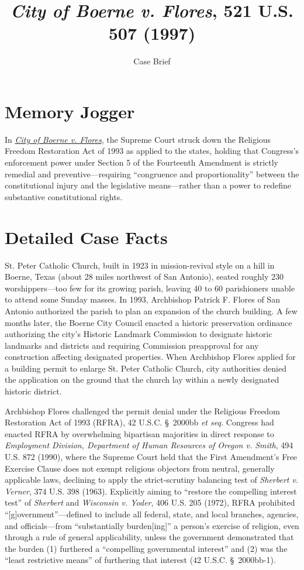 \documentclass[12pt]{article}
\title{\textit{City of Boerne v. Flores}, 521 U.S. 507 (1997)}
\subtitle{Case Brief}
\author{}
\date{}
\begin{document}
\maketitle

\section{Memory Jogger}

In \href{https://www.courtlistener.com/opinion/118140/city-of-boerne-v-flores/}{\textit{City of Boerne v. Flores}}, the Supreme Court struck down the Religious Freedom Restoration Act of 1993 as applied to the states, holding that Congress's enforcement power under Section 5 of the Fourteenth Amendment is strictly remedial and preventive---requiring ``congruence and proportionality'' between the constitutional injury and the legislative means---rather than a power to redefine substantive constitutional rights.

\section{Detailed Case Facts}

St. Peter Catholic Church, built in 1923 in mission-revival style on a hill in Boerne, Texas (about 28 miles northwest of San Antonio), seated roughly 230 worshippers---too few for its growing parish, leaving 40 to 60 parishioners unable to attend some Sunday masses. In 1993, Archbishop Patrick F. Flores of San Antonio authorized the parish to plan an expansion of the church building. A few months later, the Boerne City Council enacted a historic preservation ordinance authorizing the city's Historic Landmark Commission to designate historic landmarks and districts and requiring Commission preapproval for any construction affecting designated properties. When Archbishop Flores applied for a building permit to enlarge St. Peter Catholic Church, city authorities denied the application on the ground that the church lay within a newly designated historic district.

Archbishop Flores challenged the permit denial under the Religious Freedom Restoration Act of 1993 (RFRA), 42 U.S.C. \S~2000bb \textit{et seq.} Congress had enacted RFRA by overwhelming bipartisan majorities in direct response to \textit{Employment Division, Department of Human Resources of Oregon v. Smith}, 494 U.S. 872 (1990), where the Supreme Court held that the First Amendment's Free Exercise Clause does not exempt religious objectors from neutral, generally applicable laws, declining to apply the strict-scrutiny balancing test of \textit{Sherbert v. Verner}, 374 U.S. 398 (1963). Explicitly aiming to ``restore the compelling interest test'' of \textit{Sherbert} and \textit{Wisconsin v. Yoder}, 406 U.S. 205 (1972), RFRA prohibited ``[g]overnment''---defined to include all federal, state, and local branches, agencies, and officials---from ``substantially burden[ing]'' a person's exercise of religion, even through a rule of general applicability, unless the government demonstrated that the burden (1) furthered a ``compelling governmental interest'' and (2) was the ``least restrictive means'' of furthering that interest (42 U.S.C. \S~2000bb-1).
\end{document}
